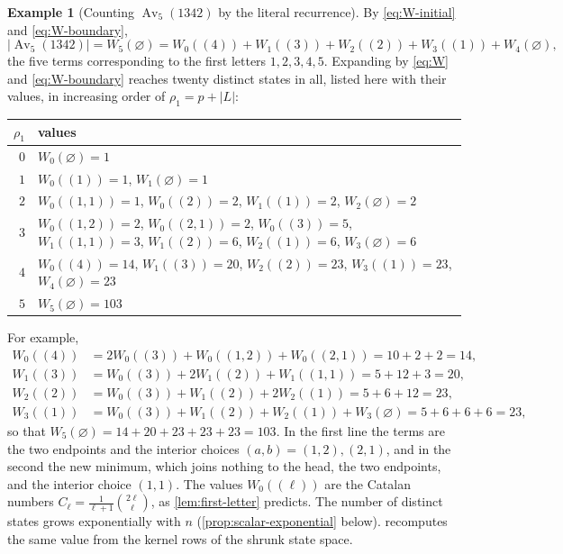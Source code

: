 \documentclass[11pt,reqno]{amsart}
\theoremstyle{definition}
\newtheorem{example}[example]{Example}
\theoremstyle{remark}
\newcommand{\Av}{\operatorname{Av}}
\begin{document}
\begin{example}[Counting $\Av_5(1342)$ by the literal recurrence]
\label{ex:1342-literal-count}
By \eqref{eq:W-initial} and \eqref{eq:W-boundary},
\[
 \lvert\Av_5(1342)\rvert=W_5(\varnothing)
 =W_0((4))+W_1((3))+W_2((2))+W_3((1))+W_4(\varnothing),
\]
the five terms corresponding to the first letters $1,2,3,4,5$.  Expanding
by \eqref{eq:W} and \eqref{eq:W-boundary} reaches twenty distinct states in
all, listed here with their values, in increasing order of $\rho_1=p+|L|$:
\begin{center}
\small
\setlength{\tabcolsep}{5pt}
\begin{tabular}{@{}rl@{}}
\toprule
$\rho_1$ & values \\
\midrule
$0$ & $W_0(\varnothing)=1$ \\
$1$ & $W_0((1))=1$, $W_1(\varnothing)=1$ \\
$2$ & $W_0((1,1))=1$, $W_0((2))=2$, $W_1((1))=2$, $W_2(\varnothing)=2$ \\
$3$ & $W_0((1,2))=2$, $W_0((2,1))=2$, $W_0((3))=5$, $W_1((1,1))=3$,
      $W_1((2))=6$, $W_2((1))=6$, $W_3(\varnothing)=6$ \\
$4$ & $W_0((4))=14$, $W_1((3))=20$, $W_2((2))=23$, $W_3((1))=23$,
      $W_4(\varnothing)=23$ \\
$5$ & $W_5(\varnothing)=103$ \\
\bottomrule
\end{tabular}
\end{center}
For example,
\begin{align*}
 W_0((4))&=2W_0((3))+W_0((1,2))+W_0((2,1))=10+2+2=14,\\
 W_1((3))&=W_0((3))+2W_1((2))+W_1((1,1))=5+12+3=20,\\
 W_2((2))&=W_0((3))+W_1((2))+2W_2((1))=5+6+12=23,\\
 W_3((1))&=W_0((3))+W_1((2))+W_2((1))+W_3(\varnothing)=5+6+6+6=23,
\end{align*}
so that $W_5(\varnothing)=14+20+23+23+23=103$.  In the first line the terms
are the two endpoints and the interior choices $(a,b)=(1,2),(2,1)$, and in
the second the new minimum, which joins nothing to the head, the two
endpoints, and the interior choice $(1,1)$.  The values $W_0((\ell))$ are the
Catalan numbers $C_\ell=\frac{1}{\ell+1}\binom{2\ell}{\ell}$, as
\cref{lem:first-letter} predicts.  The number of distinct states grows exponentially with $n$
(\cref{prop:scalar-exponential} below).   recomputes
the same value from the kernel rows of the shrunk state space.
\end{example}
\end{document}
